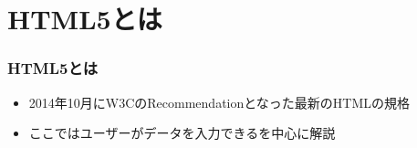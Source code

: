 

\frame{\maketitle}
\section{HTML5とは}
\begin{frame}[containsverbatim]
 \frametitle{HTML5とは}
 \begin{itemize}
  \item 2014年10月にW3CのRecommendationとなった最新のHTMLの規格
  \item ここではユーザーがデータを入力できるを中心に解説
 \end{itemize}
\end{frame}
